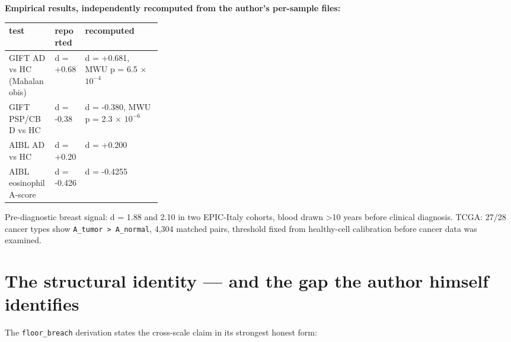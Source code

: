 \documentclass[12pt,a4paper]{article}
\begin{document}
\textbf{Empirical results, independently recomputed from the author's per-sample files:}


\begin{small}
\begin{tabularx}{\linewidth}{L{0.30\linewidth}YY}
\toprule
\textbf{test} & \textbf{reported} & \textbf{recomputed} \\
\midrule
GIFT AD vs HC (Mahalanobis) & d = +0.68 & d = +0.681, MWU p = 6.5 $\times$ $10^{-4}$ \\
GIFT PSP/CBD vs HC & d = -0.38 & d = -0.380, MWU p = 2.3 $\times$ $10^{-6}$ \\
AIBL AD vs HC & d = +0.20 & d = +0.200 \\
AIBL eosinophil A-score & d = -0.426 & d = -0.4255 \\
\bottomrule
\end{tabularx}
\end{small}


Pre-diagnostic breast signal: d = 1.88 and 2.10 in two EPIC-Italy cohorts, blood drawn >10 years before clinical diagnosis. TCGA: 27/28 cancer types show \texttt{A\_tumor > A\_normal}, 4,304 matched pairs, threshold fixed from healthy-cell calibration before cancer data was examined.







\section{The structural identity --- and the gap the author himself identifies}

The \texttt{floor\_breach} derivation states the cross-scale claim in its strongest honest form:
\end{document}
